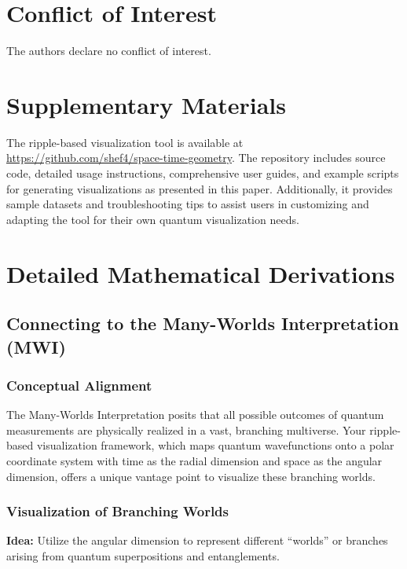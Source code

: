 \documentclass[12pt]{article}
\begin{document}
\section*{Conflict of Interest}
The authors declare no conflict of interest.

\section*{Supplementary Materials}
The ripple-based visualization tool is available at \url{https://github.com/shef4/space-time-geometry}. The repository includes source code, detailed usage instructions, comprehensive user guides, and example scripts for generating visualizations as presented in this paper. Additionally, it provides sample datasets and troubleshooting tips to assist users in customizing and adapting the tool for their own quantum visualization needs.

\appendix

\section{Detailed Mathematical Derivations}
\label{appendix:A}

\subsection{Connecting to the Many-Worlds Interpretation (MWI)}
\subsubsection{Conceptual Alignment}
The Many-Worlds Interpretation posits that all possible outcomes of quantum measurements are physically realized in a vast, branching multiverse. Your ripple-based visualization framework, which maps quantum wavefunctions onto a polar coordinate system with time as the radial dimension and space as the angular dimension, offers a unique vantage point to visualize these branching worlds.

\subsubsection{Visualization of Branching Worlds}
\textbf{Idea:} Utilize the angular dimension to represent different “worlds” or branches arising from quantum superpositions and entanglements.
\end{document}
